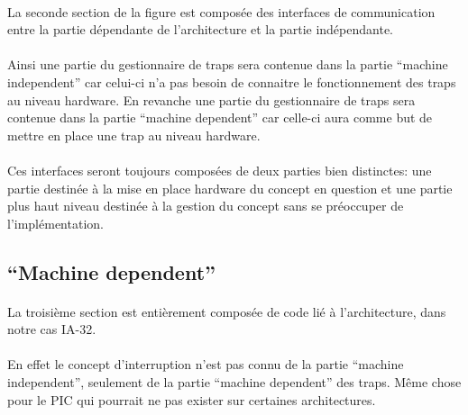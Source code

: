 \documentclass[10pt,a4wide]{article}
\begin{document}
\paragraph{}

La seconde section de la figure est compos\'ee des interfaces de communication
entre la partie d\'ependante de l'architecture et la partie ind\'ependante.

\paragraph{}

Ainsi une partie du gestionnaire de traps sera contenue dans la partie
``machine independent'' car celui-ci n'a pas besoin de connaitre le
fonctionnement des traps au niveau hardware. En revanche une partie
du gestionnaire de traps sera contenue dans la partie ``machine dependent''
car celle-ci aura comme but de mettre en place une trap au niveau hardware.

\paragraph{}

Ces interfaces seront toujours compos\'ees de deux parties bien distinctes:
une partie destin\'ee \`a la mise en place hardware du concept en
question et une partie plus haut niveau destin\'ee \`a la gestion du concept
sans se pr\'eoccuper de l'impl\'ementation.

\subsection{``Machine dependent''}

\paragraph{}

La troisi\`eme section est enti\`erement compos\'ee de code li\'e \`a
l'architecture, dans notre cas IA-32.

\paragraph{}

En effet le concept d'interruption n'est pas connu de la partie
``machine independent'', seulement de la partie ``machine dependent'' des
traps. M\^eme chose pour le PIC qui pourrait ne pas exister sur
certaines architectures.
\end{document}
